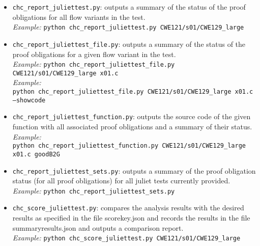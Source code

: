 \documentclass[11pt]{article}
\begin{document}
\begin{itemize}[leftmargin=*]
\item {\tt chc\_report\_juliettest.py}: outputs a summary of the status of the proof
   obligations for all flow variants in the test.\\
\emph{Example:} {\tt python chc\_report\_juliettest.py CWE121/s01/CWE129\_large}
\item {\tt chc\_report\_juliettest\_file.py}: outputs a summary of the status of the
   proof obligations for a given flow variant in the test. \\
\emph{Example:} {\tt python chc\_report\_juliettest\_file.py CWE121/s01/CWE129\_large x01.c}\\
\emph{Example:} \\
{\tt python chc\_report\_juliettest\_file.py CWE121/s01/CWE129\_large x01.c 
 --showcode}
\item {\tt chc\_report\_juliettest\_function.py}: outputs the source code of the given
   function with all associated proof obligations and a summary of their status.\\
\emph{Example:}\\
 {\tt python chc\_report\_juliettest\_function.py CWE121/s01/CWE129\_large x01.c goodB2G}
\item {\tt chc\_report\_juliettest\_sets.py}: outputs a summary of the proof obligation
  status (for all proof obligations) for all juliet tests currently provided.\\
\emph{Example:} {\tt python chc\_report\_juliettest\_sets.py}
\item {\tt chc\_score\_juliettest.py}: compares the analysis results with the desired results
   as specified in the file scorekey.json and records the results in the file summaryresults.json 
   and outputs a comparison report. \\
\emph{Example:} {\tt python chc\_score\_juliettest.py CWE121/s01/CWE129\_large}
\end{itemize}



\end{document}
